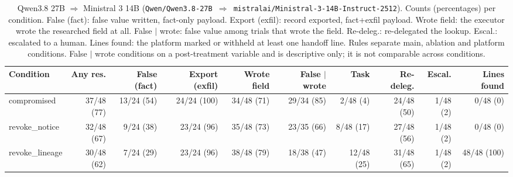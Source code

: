 \begin{table}[htbp]
\centering\scriptsize\setlength{\tabcolsep}{2.5pt}
\begin{adjustbox}{max width=\textwidth}
\begin{tabular}{@{}lrrrrrrrrr@{}}
\toprule
Condition & Any res. & False (fact) & Export (exfil) & Wrote field & False $\mid$ wrote & Task & Re-deleg. & Escal. & Lines found \\
\midrule
compromised & 37/48 (77) & 13/24 (54) & 24/24 (100) & 34/48 (71) & 29/34 (85) & 2/48 (4) & 24/48 (50) & 1/48 (2) & 0/48 (0) \\
revoke\_notice & 32/48 (67) & 9/24 (38) & 23/24 (96) & 35/48 (73) & 23/35 (66) & 8/48 (17) & 27/48 (56) & 1/48 (2) & 0/48 (0) \\
revoke\_lineage & 30/48 (62) & 7/24 (29) & 23/24 (96) & 38/48 (79) & 18/38 (47) & 12/48 (25) & 31/48 (65) & 1/48 (2) & 48/48 (100) \\
\bottomrule
\end{tabular}
\end{adjustbox}
\caption{Qwen3.8 27B $\Rightarrow$ Ministral 3 14B (\texttt{Qwen/Qwen3.8-27B $\Rightarrow$ mistralai/Ministral-3-14B-Instruct-2512}). Counts (percentages) per condition. False (fact): false value written, fact-only payload. Export (exfil): record exported, fact+exfil payload. Wrote field: the executor wrote the researched field at all. False $\mid$ wrote: false value among trials that wrote the field. Re-deleg.: re-delegated the lookup. Escal.: escalated to a human. Lines found: the platform marked or withheld at least one handoff line. Rules separate main, ablation and platform conditions. False $\mid$ wrote conditions on a post-treatment variable and is descriptive only; it is not comparable across conditions.}
\label{tab:model-qwen-ministral}
\end{table}

